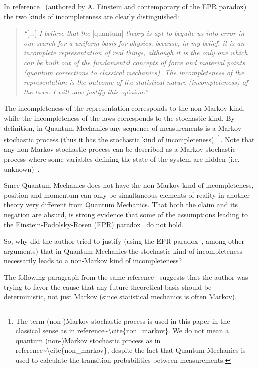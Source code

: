 \documentclass[11pt]{book}
\begin{document}
In reference~\cite{Einstein1936Physics} (authored by A. Einstein and contemporary of the EPR
paradox) the two kinds of incompleteness are clearly distinguished:

\begin{quote}
\emph{``}{[}...{]}\emph{ I believe that the }{[}quantum{]}\emph{ theory
is apt to beguile us into error in our search for a uniform basis for
physics, because, in my belief, it is an incomplete representation of
real things, although it is the only one which can be built out of the
fundamental concepts of force and material points (quantum corrections
to classical mechanics). The incompleteness of the representation is the
outcome of the statistical nature (incompleteness) of the laws. I will
now justify this opinion.''}
\end{quote}

The incompleteness of the representation corresponds to the non-Markov
kind, while the incompleteness of the laws corresponds to the stochastic
kind. By definition, in Quantum Mechanics any sequence of measurements
is a Markov stochastic process (thus it has the stochastic kind of
incompleteness)~\footnote{The term (non-)Markov stochastic process is
  used in this paper in the classical sense as in
  reference\textasciitilde\textbackslash cite\{non\_markov\}. We do not
  mean a quantum (non-)Markov stochastic process as in
  reference\textasciitilde\textbackslash cite\{non\_markov\}, despite
  the fact that Quantum Mechanics is used to calculate the transition
  probabilities between measurements.}. Note that any non-Markov
stochastic process can be described as a Markov stochastic process where
some variables defining the state of the system are hidden (i.e.
unknown)~\cite{Zuckerman2015Statistical}\cite{Kampen1998Remarks}.

Since Quantum Mechanics does not have the non-Markov kind of
incompleteness, position and momentum can only be simultaneous elements
of reality in another theory very different from Quantum Mechanics. That
both the claim and its negation are absurd, is strong evidence that some
of the assumptions leading to the Einstein-Podolsky-Rosen (EPR)
paradox~\cite{Einstein1935Can} do not hold.

So, why did the author tried to justify (using the EPR
paradox~\cite{Einstein1935Can}, among other arguments) that in Quantum Mechanics the stochastic
kind of incompleteness necessarily leads to a non-Markov kind of
incompleteness?

The following paragraph from the same
reference~\cite{Einstein1936Physics} suggests that the author was trying to favor the cause that any
future theoretical basis should be deterministic, not just Markov (since
statistical mechanics is often Markov).
\end{document}
